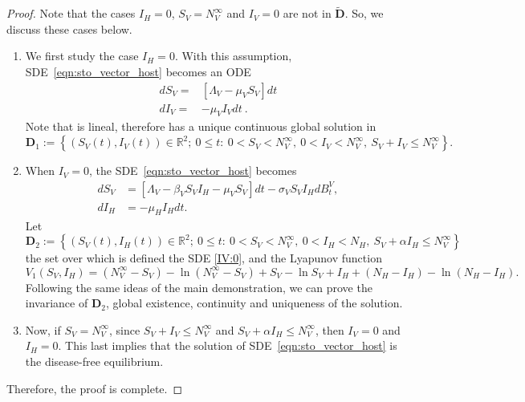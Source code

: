 \begin{proof}
Note that the cases $I_{H} = 0$, $S_{V} = N_{V}^{\infty}$ and $I_{V} = 0$ are 
not in $\widetilde{\mathbf{D}}$. So, we discuss these cases below.
\begin{enumerate}[{(CASE-}I)]
	\item 
	We first study the case $I_{H} = 0$. With this assumption, 
	SDE~\eqref{eqn:sto_vector_host} becomes an ODE
	\begin{equation}\label{IH:0}
		\begin{aligned}
			dS_{V} 
			=&
			\left[
			\Lambda_{V} - \mu_{V}S_{V}
			\right]dt 
			\\
			dI_{V} 
			=&
			- \mu_{V} I_{V}dt~.
		\end{aligned}
	\end{equation}
	Note that  is lineal, therefore has a unique continuous global 
	solution in 
	$$
		\mathbf{D}_{1} := 
		\left\{ 
		\left( 
		S_{V}(t),
		I_{V}(t) 
		\right)
		\in \mathbb{R}^{2};
		\ 0\leq t: \ 0< S_{V} < N_{V}^{\infty},\ 
		0< I_{V} < N_{V}^{\infty},\ 
		S_{V} + I_{V}\leq N_{V}^{\infty}
		\right\}.
		$$
%
	\item
	When $I_{V} = 0$, the SDE~\eqref{eqn:sto_vector_host} becomes
	\begin{equation} \label{IV:0}
		\begin{aligned}
			d S_{V} &= 
			\left [
			\Lambda_{V} - \beta_{V} S_{V} I_{H} - \mu_{V} S_{V} 
			\right ] dt
			- \sigma_{V} S_{V} I_{H} dB_{t}^{V},
			\\
			d I_{H} &= 
			- \mu_{H} I_{H} dt .
		\end{aligned}
	\end{equation}
		Let 
		$
		\mathbf{D}_{2} := 
		\left\{ 
		\left( 
		S_{V}(t),
		I_{H}(t) 
		\right)
		\in \mathbb{R}^{2};
		\ 0\leq t :
		\ 0<S_{V}< N_{V}^{\infty},
		\ 0< I_{H}< N_{H},		 
		\ S_{V} + \alpha I_{H} \leq N_{V}^{\infty}
		\right\}
		$ 
		the set over which is defined the SDE \eqref{IV:0}, and the Lyapunov 
		function
		$$
		V_{1}
		\left( 
		S_{V},I_{H} 
		\right) 
		= \left(N_{V}^{\infty} - S_{V}\right) - \ln\left(N_{V}^{\infty} - 
		S_{V}\right) + S_{V} - \ln S_{V} + I_{H} + \left(N_{H} - I_{H}\right) - 
		\ln\left(N_{H} - I_{H}\right).
		$$
		Following the same ideas of the main demonstration, we can prove the 
		invariance of $\mathbf{D}_{2}$, global existence, continuity and 
		uniqueness of the solution.
%
	\item
	Now, if $S_{V} = N_{V}^{\infty}$, since $S_{V} + I_{V} \leq N_{V}^{\infty}$ 
	and $S_{V} + \alpha I_{H} \leq N_{V}^{\infty}$, then $I_{V} = 0$ and $I_{H} 
	= 0$. This last implies that the solution of 
	SDE~\eqref{eqn:sto_vector_host} is the disease-free equilibrium.
\end{enumerate}

Therefore, the proof is complete.
\end{proof}